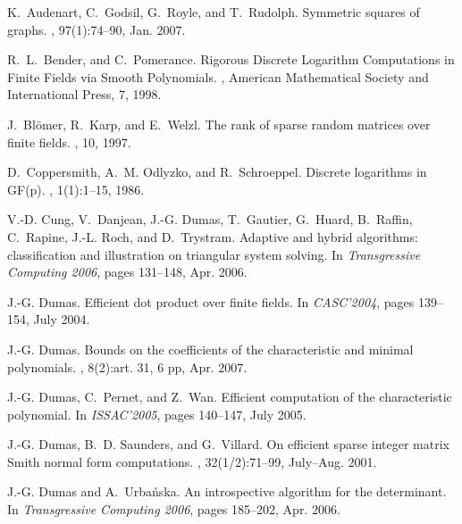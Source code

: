 \documentclass{article}
\begin{document}
{\small
\begin{thebibliography}{10}

K.~Audenart, C.~Godsil, G.~Royle, and T.~Rudolph.
\newblock Symmetric squares of graphs.
, 97(1):74--90, Jan. 2007.

R.~L.~Bender, and C.~Pomerance.
\newblock Rigorous Discrete Logarithm Computations in Finite
        Fields via Smooth Polynomials.
, American Mathematical
        Society and International Press, 7, 1998.

J.~Bl{\"o}mer, R.~Karp, and E.~Welzl.
\newblock The rank of sparse random matrices over finite fields.
, 10, 1997.

D.~Coppersmith, A.~M. Odlyzko, and R.~Schroeppel.
\newblock Discrete logarithms in {GF}(p).
, 1(1):1--15, 1986.

V.-D. Cung, V.~Danjean, J.-G. Dumas, T.~Gautier, G.~Huard, B.~Raffin,
  C.~Rapine, J.-L. Roch, and D.~Trystram.
\newblock Adaptive and hybrid algorithms: classification and illustration on
  triangular system solving.
\newblock In {\em {Transgressive Computing} 2006}, pages 131--148, Apr. 2006.

J.-G. Dumas.
\newblock Efficient dot product over finite fields.
\newblock In {\em {CASC}'2004}, pages 139--154, July 2004.

J.-G. Dumas.
\newblock Bounds on the coefficients of the characteristic and minimal
  polynomials.
,
  8(2):art. 31, 6 pp, Apr. 2007.

J.-G. Dumas, C.~Pernet, and Z.~Wan.
\newblock Efficient computation of the characteristic polynomial.
\newblock In {\em {ISSAC}'2005}, pages 140--147, July 2005.

J.-G. Dumas, B.~D. Saunders, and G.~Villard.
\newblock On efficient sparse integer matrix {Smith} normal form computations.
, 32(1/2):71--99, July--Aug.
  2001.

J.-G. Dumas and A.~Urba\'nska.
\newblock An introspective algorithm for the determinant.
\newblock In {\em {Transgressive Computing} 2006}, pages 185--202, Apr. 2006.


\end{thebibliography}}
\end{document}
